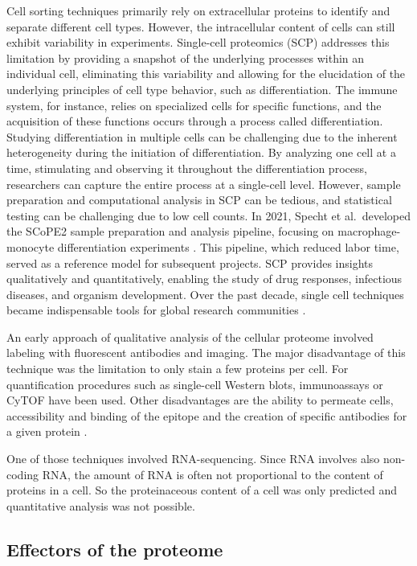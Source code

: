 \documentclass[
]{article}
\begin{document}
Cell sorting techniques primarily rely on extracellular proteins to
identify and separate different cell types. However, the intracellular
content of cells can still exhibit variability in experiments.
Single-cell proteomics (SCP) addresses this limitation by providing a
snapshot of the underlying processes within an individual cell,
eliminating this variability and allowing for the elucidation of the
underlying principles of cell type behavior, such as differentiation.
The immune system, for instance, relies on specialized cells for
specific functions, and the acquisition of these functions occurs
through a process called differentiation. Studying differentiation in
multiple cells can be challenging due to the inherent heterogeneity
during the initiation of differentiation. By analyzing one cell at a
time, stimulating and observing it throughout the differentiation
process, researchers can capture the entire process at a single-cell
level. However, sample preparation and computational analysis in SCP can
be tedious, and statistical testing can be challenging due to low cell
counts. In 2021, Specht et al.~developed the SCoPE2 sample preparation
and analysis pipeline, focusing on macrophage-monocyte differentiation
experiments \citep{Specht2021}. This pipeline, which reduced labor time,
served as a reference model for subsequent projects. SCP provides
insights qualitatively and quantitatively, enabling the study of drug
responses, infectious diseases, and organism development. Over the past
decade, single cell techniques became indispensable tools for global
research communities \citep{Minakshi et al., 2019}.

An early approach of qualitative analysis of the cellular proteome
involved labeling with fluorescent antibodies and imaging. The major
disadvantage of this technique was the limitation to only stain a few
proteins per cell. For quantification procedures such as single-cell
Western blots, immunoassays or CyTOF have been used. Other disadvantages
are the ability to permeate cells, accessibility and binding of the
epitope and the creation of specific antibodies for a given protein
\citep{Budnik2018}.

One of those techniques involved RNA-sequencing. Since RNA involves also
non-coding RNA, the amount of RNA is often not proportional to the
content of proteins in a cell. So the proteinaceous content of a cell
was only predicted and quantitative analysis was not possible.

\hypertarget{effectors-of-the-proteome}{%
\subsection{Effectors of the proteome}\label{effectors-of-the-proteome}}
\end{document}
